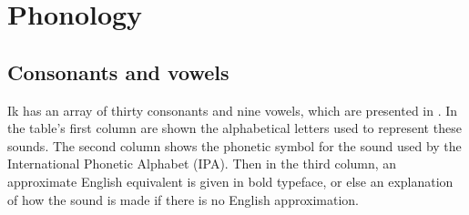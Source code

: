 \section{Phonology}\label{sec:2}
 
\subsection{Consonants and vowels}\label{sec:2.1}


Ik has an array of thirty consonants and nine vowels, which are presented in . In the table’s first column are shown the alphabetical letters used to represent these sounds. The second column shows the phonetic symbol for the sound used by the International Phonetic Alphabet (IPA). Then in the third column, an approximate English equivalent is given in bold typeface, or else an explanation of how the sound is made if there is no English approximation.


